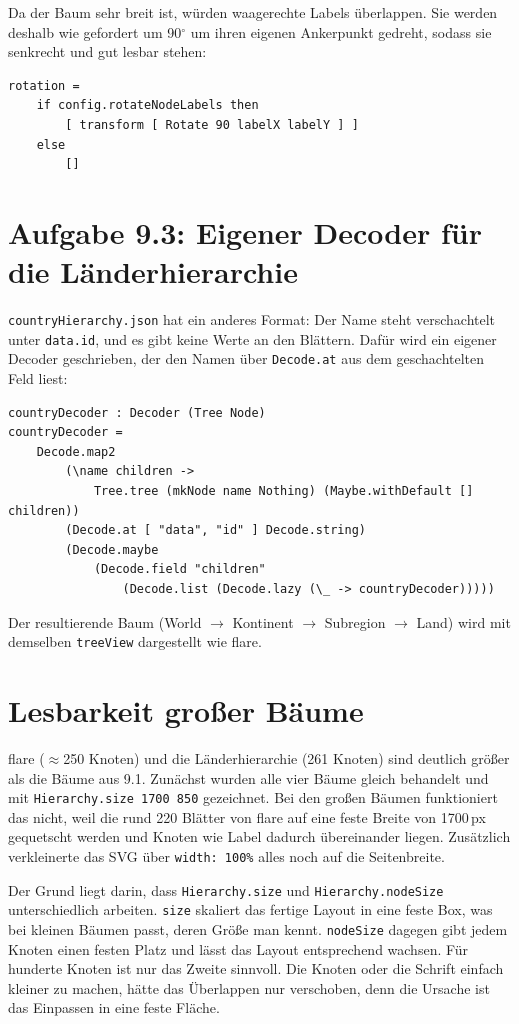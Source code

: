 \documentclass[11pt,a4paper]{article}
\begin{document}
Da der Baum sehr breit ist, würden waagerechte Labels überlappen. Sie werden
deshalb wie gefordert um 90$^\circ$ um ihren eigenen Ankerpunkt gedreht,
sodass sie senkrecht und gut lesbar stehen:

\begin{verbatim}
rotation =
    if config.rotateNodeLabels then
        [ transform [ Rotate 90 labelX labelY ] ]
    else
        []
\end{verbatim}

\section*{Aufgabe 9.3: Eigener Decoder für die Länderhierarchie}

\texttt{countryHierarchy.json} hat ein anderes Format: Der Name steht
verschachtelt unter \texttt{data.id}, und es gibt keine Werte an den Blättern.
Dafür wird ein eigener Decoder geschrieben, der den Namen über
\texttt{Decode.at} aus dem geschachtelten Feld liest:

\begin{verbatim}
countryDecoder : Decoder (Tree Node)
countryDecoder =
    Decode.map2
        (\name children ->
            Tree.tree (mkNode name Nothing) (Maybe.withDefault [] children))
        (Decode.at [ "data", "id" ] Decode.string)
        (Decode.maybe
            (Decode.field "children"
                (Decode.list (Decode.lazy (\_ -> countryDecoder)))))
\end{verbatim}

Der resultierende Baum (World $\to$ Kontinent $\to$ Subregion $\to$ Land) wird
mit demselben \texttt{treeView} dargestellt wie flare.

\section*{Lesbarkeit großer Bäume}

flare ($\approx$250 Knoten) und die Länderhierarchie (261 Knoten) sind deutlich
größer als die Bäume aus 9.1. Zunächst wurden alle vier Bäume gleich behandelt
und mit \texttt{Hierarchy.size 1700 850} gezeichnet. Bei den großen Bäumen
funktioniert das nicht, weil die rund 220 Blätter von flare auf eine feste
Breite von 1700\,px gequetscht werden und Knoten wie Label dadurch übereinander
liegen. Zusätzlich verkleinerte das SVG über \texttt{width:\,100\%} alles noch
auf die Seitenbreite.

Der Grund liegt darin, dass \texttt{Hierarchy.size} und
\texttt{Hierarchy.nodeSize} unterschiedlich arbeiten. \texttt{size} skaliert
das fertige Layout in eine feste Box, was bei kleinen Bäumen passt, deren
Größe man kennt. \texttt{nodeSize} dagegen gibt jedem Knoten einen festen Platz
und lässt das Layout entsprechend wachsen. Für hunderte Knoten ist nur das
Zweite sinnvoll. Die Knoten oder die Schrift einfach kleiner zu machen, hätte
das Überlappen nur verschoben, denn die Ursache ist das Einpassen in eine feste
Fläche.
\end{document}
